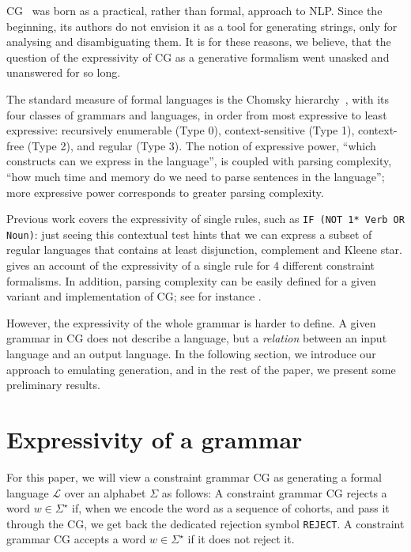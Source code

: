 \documentclass[11pt]{article}
\begin{document}
CG~\cite{karlsson1995constraint} was born as a practical, rather than formal, 
approach to NLP. 
Since the beginning, its authors do not envision it as a tool for 
generating strings, only for analysing and disambiguating them.
It is for these reasons, we believe, that the question of the expressivity of CG
as a generative formalism went unasked and unanswered for so long.

The standard measure of formal languages is the Chomsky hierarchy~\cite{chomsky1956hierarchy}, with its four
classes of grammars and languages, in order from most expressive to least expressive:
recursively enumerable (Type 0), context-sensitive (Type 1), context-free (Type 2), and
regular (Type 3).
The notion of expressive power, ``which constructs can we express in the language'', is coupled with parsing complexity, ``how much time and memory do we need to parse sentences in the language''; more expressive power corresponds to greater parsing complexity.

Previous work covers the expressivity of single rules, such as \texttt{IF (NOT 1* Verb OR Noun)}: 
just seeing this contextual test hints that we can express a subset of 
regular languages that contains at least disjunction, complement and 
Kleene star.  gives an account of the expressivity of 
a single rule for 4 different constraint formalisms. In addition, parsing 
complexity can be easily defined for a given variant and implementation of CG; 
see for instance .

However, the expressivity of the whole grammar is harder to define. 
A given grammar in CG does not describe a language, but a \emph{relation} 
between an input language and an output language. In the following section, 
we introduce our approach to emulating generation, and in the rest of the 
paper, we present some preliminary results.

\section{Expressivity of a grammar}

For this paper, we will view a constraint grammar CG as generating a formal
language $\mathcal{L}$ over an alphabet $\Sigma$ as follows:
A constraint grammar CG rejects a word $w \in \Sigma^\star$ if, when we encode
the word as a sequence of cohorts, and pass it through the CG, we get back the
dedicated rejection symbol \texttt{REJECT}. A constraint grammar CG accepts a
word $w \in \Sigma^\star$ if it does not reject it.
\end{document}
